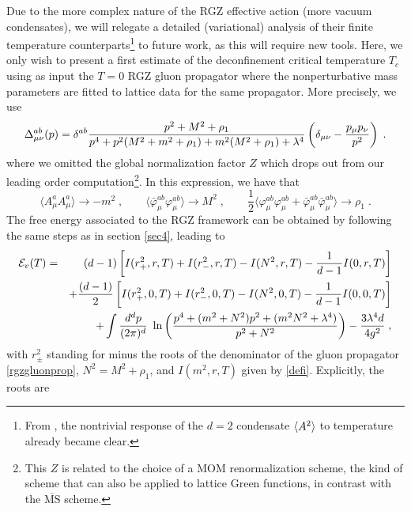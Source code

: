 Due to the more complex nature of the RGZ effective action (more vacuum
condensates), we will relegate a detailed (variational) analysis of their
finite temperature counterparts\footnote{From
\cite{Chernodub:2008kf,Dudal:2009tq,Vercauteren:2010rk}, the nontrivial response of the $d=2$
condensate $\braket{A^2}$ to temperature already became clear.} to future work, as this will
require
new tools. Here, we only wish to present a first estimate of the
deconfinement critical temperature $T_c$ using as input the $T=0$ RGZ gluon
propagator where the nonperturbative mass parameters are fitted to lattice
data for the same propagator. More precisely, we use \cite{Cucchieri:2011ig}
\begin{equation}
\Delta_{\mu\nu}^{ab}(p) = \delta^{ab} \frac{p^2+M^2+\rho_1}{%
p^4+p^2(M^2+m^2+\rho_1) + m^2(M^2+\rho_1)+\lambda^4} \left(\delta_{\mu\nu} -
\frac{p_\mu p_\nu}{p^2}\right) \;.
\label{rgzgluonprop}
\end{equation}
where we omitted the global normalization factor $Z$ which drops out from
our leading order computation\footnote{This $Z$ is related to the choice of a MOM renormalization scheme, the kind
of scheme that can also be applied to lattice Green functions, in contrast
with the $\overline{\mbox{MS}}$ scheme.}. In this expression, we have that
\begin{equation}
\langle A_\mu^aA_\mu^a\rangle \to -m^2 \;, \qquad
\langle\bar\varphi_\mu^{ab}\varphi_\mu^{ab}\rangle \to M^2 \;, \qquad
\frac12 \langle \varphi_\mu^{ab}\varphi_\mu^{ab} +
\bar\varphi_\mu^{ab}\bar\varphi_\mu^{ab} \rangle \to \rho_1 \;.
\end{equation}
The free energy associated to the RGZ framework can be obtained by following the same steps as in section \ref{sec4}, leading to
\begin{eqnarray}
{\cal E}_{v}(T) &=& (d-1)\left[ I(r_{+}^{2}, r,T) + I(r_{-}^{2}, r,T) - I(N^{2}, r,T) - \frac{1}{d-1}I(0, r,T) \right]
\nonumber \\
&&
+\frac{(d-1)}{2}\left[ I(r_{+}^{2}, 0,T) + I(r_{-}^{2}, 0,T) - I(N^{2}, 0,T) - \frac{1}{d-1}I(0, 0,T) \right]
\nonumber \\
&&
+\int \frac{d^{d}p}{ (2\pi)^{d} }\,\, \ln \left( \frac{ p^{4} + (m^{2}+ N^{2})p^{2} + (m^{2}N^{2} + \lambda^{4}) }{p^{2}+N^{2}}  \right)
-  \frac{3\lambda^{4}d}{4g^{2}}\;,
\label{vacfreeenergy}
\end{eqnarray}
with $r_{\pm}^{2}$ standing for minus the roots of the denominator of the gluon propagator \eqref{rgzgluonprop}, $N^{2} = M^{2} + \rho_{1}$, and $I(m^{2},r,T)$  given by \eqref{defi}. Explicitly, the roots are
